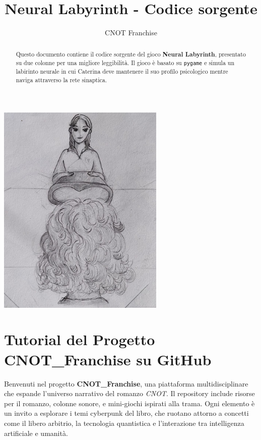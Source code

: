 \documentclass[a4paper,10pt]{article}
\title{Neural Labyrinth - Codice sorgente}
\author{CNOT Franchise}
\date{}
\begin{document}
\maketitle

\begin{center}
    \includegraphics[width=0.6\textwidth]{../artwork/originali/Eva_Cate.png}
\end{center}
\newpage

\begin{abstract}
Questo documento contiene il codice sorgente del gioco \textbf{Neural Labyrinth}, presentato su due colonne per una migliore leggibilità. Il gioco è basato su \texttt{pygame} e simula un labirinto neurale in cui Caterina deve mantenere il suo profilo psicologico mentre naviga attraverso la rete sinaptica.
\end{abstract}



\section*{Tutorial del Progetto CNOT\_Franchise su GitHub}

Benvenuti nel progetto \textbf{CNOT\_Franchise}, una piattaforma multidisciplinare che espande l'universo narrativo del romanzo \emph{CNOT}. Il repository include risorse per il romanzo, colonne sonore, e mini-giochi ispirati alla trama. Ogni elemento è un invito a esplorare i temi cyberpunk del libro, che ruotano attorno a concetti come il libero arbitrio, la tecnologia quantistica e l'interazione tra intelligenza artificiale e umanità.
\end{document}
